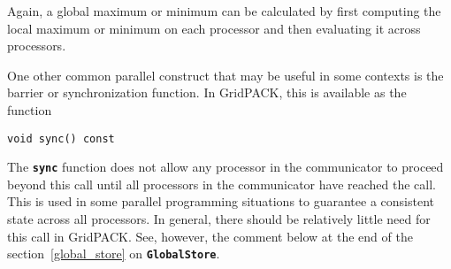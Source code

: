 Again, a global maximum or minimum can be calculated by first computing the
local maximum or minimum on each processor and then evaluating it across processors. 

One other common parallel construct that may be useful in some contexts is the barrier or synchronization function. In GridPACK, this is available as the function

{
\color{red}
\begin{Verbatim}[fontseries=b]
void sync() const
\end{Verbatim}
}

The \texttt{\textbf{sync}} function does not allow any processor in the
communicator to proceed beyond this call until all processors in the
communicator have reached the call. This is used in some parallel programming
situations to guarantee a consistent state across all processors.  In general,
there should be relatively little need for this call in GridPACK. See, however,
the comment below at the end of the section~\ref{global_store} on \texttt{\textbf{GlobalStore}}.
